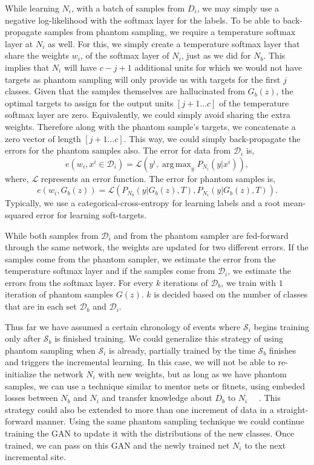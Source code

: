 \documentclass[10pt,twocolumn,letterpaper]{article}
\def \cS{{\mathcal{S}}}
\def \cD{{\mathcal{D}}}
\DeclareMathOperator*{\argmax}{arg\,max}
\begin{document}
	While learning $N_i$, with a batch of samples from $D_i$, we may simply use a negative log-likelihood with the softmax layer for the labels. 
	To be able to back-propagate samples from phantom sampling, we require a temperature softmax layer at $N_i$ as well. 
	For this, we simply create a temperature softmax layer that share the weights $w_i$, of the softmax layer of $N_i$, just as we did for $N_b$. 
	This implies that $N_i$ will have $c - j+1$ additional units for which we would not have targets as phantom sampling will only provide us with targets for the first $j$ classes. 
	Given that the samples themselves are hallucinated from $G_b(z)$, the optimal targets to assign for the output units $[j+1 \hdots c]$ of the temperature softmax layer are zero. 
	Equivalently, we could simply avoid sharing the extra weights. 
	Therefore along with the phantom sample's targets, we concatenate a zero vector of length $[j+1 \hdots c]$. 
	This way, we could simply back-propagate the errors for the phantom samples also. 
	The error for data from $\cD_i$ is,
	\begin{equation}
	e(w_i,x^i \in \cD_i) = \mathcal{L} ( y^i, \argmax_{y} P_{N_i}(y \vert x^i) ),
	\end{equation}
	where, $\mathcal{L}$ represents an error function. 
	The error for phantom samples is,
	\begin{equation}
	e(w_i,G_b(z)) = \mathcal{L} ( P_{N_b}(y \vert G_b(z), T), P_{N_i}(y \vert G_b(z), T)).
	\end{equation}
	Typically, we use a categorical-cross-entropy for learning labels and a root mean-squared error for learning soft-targets.
	
	While both samples from $\cD_i$ and from the phantom sampler are fed-forward through the same network, the weights are updated for two different errors. If the samples come from the phantom sampler, we estimate the error from the temperature softmax layer and if the samples come from $\cD_i$, we estimate the errors from the softmax layer. 
	For every $k$ iterations of $\cD_b$, we train with $1$ iteration of phantom samples $G(z)$. 
	$k$ is decided based on the number of classes that are in each set $\cD_b$ and $\cD_i$. 
	
	Thus far we have  assumed a certain chronology of events where $\cS_i$ begins training only after $\cS_b$ is finished training. 
	We could generalize this strategy of using phantom sampling when $\cS_i$ is already, partially trained by the time $\cS_b$ finishes and triggers the incremental learning. 
	In this case, we will not be able to re-initialize the network $N_i$ with new weights, but as long as we have phantom samples, we can use a technique similar to mentor nets or fitnets, using embeded losses between $N_b$ and $N_i$ and transfer knowledge about $D_b$ to $N_i$ ~\cite{romero2014fitnets}~\cite{venkatesan2016diving}. 
	This strategy could also be extended to more than one increment of data in a straight-forward manner. 
	Using the same phantom sampling technique we could continue training the GAN to update it with the distributions of the new classes.
	Once trained, we can pass on this GAN and the newly trained net $N_i$ to the next incremental site.	 
	
\end{document}
